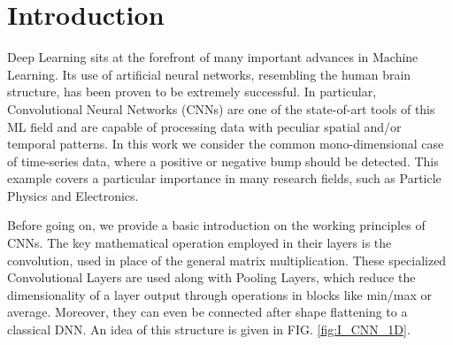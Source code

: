 \documentclass[prl,twocolumn]{revtex4-1}
\newcommand{\figref}[1]{FIG. \ref{#1}}
\begin{document}
\section{Introduction}
Deep Learning sits at the forefront of many important advances in Machine Learning. Its use of artificial neural networks, resembling the human brain structure, has been proven to be extremely successful. In particular, Convolutional Neural Networks (CNNs) are one of the state-of-art tools of this ML field and are capable of processing data with peculiar spatial and/or temporal patterns. In this work we consider the common mono-dimensional case of time-series data, where a positive or negative bump should be detected. This example covers a particular importance in many research fields, such as Particle Physics and Electronics.

Before going on, we provide a basic introduction on the working principles of CNNs. The key mathematical operation employed in their layers is the convolution, used in place of the general matrix multiplication. These specialized Convolutional Layers are used along with Pooling Layers, which reduce the dimensionality of a layer output through operations in blocks like min/max or average. Moreover, they can even be connected after shape flattening to a classical DNN. An idea of this structure is given in \figref{fig:I_CNN_1D}.

\end{document}
